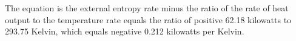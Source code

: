 The equation is the external entropy rate minus the ratio of the rate of heat output to the temperature rate equals the ratio of positive 62.18 kilowatts to 293.75 Kelvin, which equals negative 0.212 kilowatts per Kelvin.